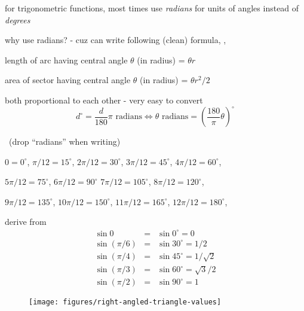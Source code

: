 \documentclass[17pt,landscape]{foils}
\begin{document}
{{

\bit
\item
	for trigonometric functions, most times use \emph{radians} for units of angles instead of \emph{degrees}

\vitem
	why use radians? - cuz can write following (clean) formula, \eg,
	\bit
	\item
		{length of arc having central angle} $\theta$ { (in radius)} = $\theta r$
	\item
		{area of sector having central angle} $\theta$ { (in radius)} = $\theta r^2 /2$
	\eit

\vitem
	both proportional to each other - very easy to convert
	$$
		d^\circ = \frac{d}{180} \pi \mbox{ radians}
	\Leftrightarrow
		\theta \mbox{ radians} = \left( \frac{180}{\pi} \theta \right)^\circ
	$$

\vitem
	\eg\ (drop ``radians'' when writing)
	\bit
	\item
		$0 = 0^\circ$,
		$\pi/12 = 15^\circ$,
		$2\pi/12 = 30^\circ$,
		$3\pi/12 = 45^\circ$,
		$4\pi/12 = 60^\circ$,
	\item
		$5\pi/12 = 75^\circ$,
		$6\pi/12 = 90^\circ$
		$7\pi/12 = 105^\circ$,
		$8\pi/12 = 120^\circ$,
	\item
		$9\pi/12 = 135^\circ$,
		$10\pi/12 = 150^\circ$,
		$11\pi/12 = 165^\circ$,
		$12\pi/12 = 180^\circ$,
	\eit


\eit



\bit
\item
	derive from 
	\begin{eqnarray*}
		\sin 0 &=& \sin 0^\circ = 0
		\\
		\sin ({\pi}/{6}) &=& \sin 30^\circ = 1/2
		\\
		\sin ({\pi}/{4}) &=& \sin 45^\circ = 1/\sqrt{2}
		\\
		\sin ({\pi}/{3}) &=& \sin 60^\circ = \sqrt{3}/{2}
		\\
		\sin ({\pi}/{2}) &=& \sin 90^\circ = 1
	\end{eqnarray*}
\eit

\begin{figure}
\begin{center}
	\texttt{[image: figures/right-angled-triangle-values]}
	\label{fig:triangles for special values of sin}
\end{center}
\end{figure}


}}
\end{document}
